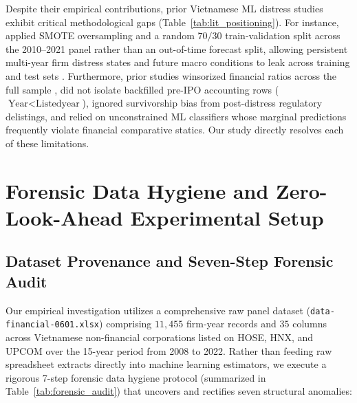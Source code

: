 \documentclass[pdflatex,sn-mathphys-num,twocolumn]{sn-jnl}
\theoremstyle{thmstyleone}
\theoremstyle{thmstyletwo}
\theoremstyle{thmstylethree}
\begin{document}
Despite their empirical contributions, prior Vietnamese ML distress studies exhibit critical methodological gaps (Table~\ref{tab:lit_positioning}). For instance, \citet{tran2022explainable} applied SMOTE oversampling and a random $70/30$ train-validation split across the 2010--2021 panel rather than an out-of-time forecast split, allowing persistent multi-year firm distress states and future macro conditions to leak across training and test sets \citep{bailey2014pseudo,lopez2018advances}. Furthermore, prior studies winsorized financial ratios across the full sample \citep[e.g.,][]{tran2023examining}, did not isolate backfilled pre-IPO accounting rows ($\text{Year} < \text{Listedyear}$), ignored survivorship bias from post-distress regulatory delistings, and relied on unconstrained ML classifiers whose marginal predictions frequently violate financial comparative statics. Our study directly resolves each of these limitations.

\section{Forensic Data Hygiene and Zero-Look-Ahead Experimental Setup}
\label{sec:data}

\subsection{Dataset Provenance and Seven-Step Forensic Audit}
Our empirical investigation utilizes a comprehensive raw panel dataset (\texttt{data-financial-0601.xlsx}) comprising $11,455$ firm-year records and $35$ columns across Vietnamese non-financial corporations listed on HOSE, HNX, and UPCOM over the 15-year period from 2008 to 2022. Rather than feeding raw spreadsheet extracts directly into machine learning estimators, we execute a rigorous 7-step forensic data hygiene protocol (summarized in Table~\ref{tab:forensic_audit}) that uncovers and rectifies seven structural anomalies:
\end{document}
